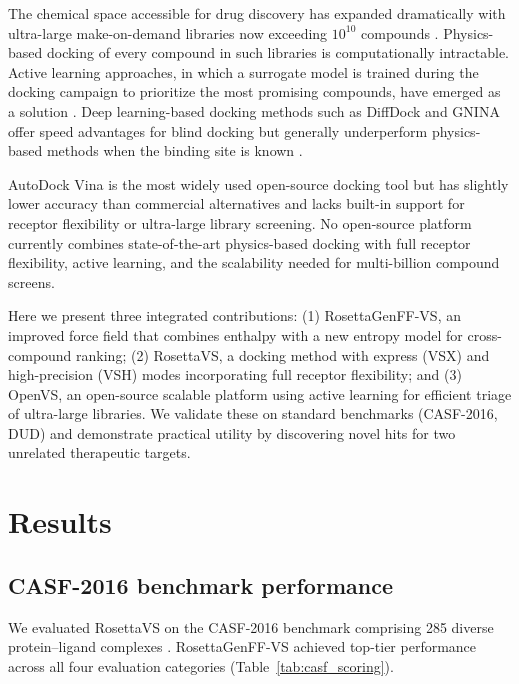 \documentclass[11pt]{article}
\begin{document}
The chemical space accessible for drug discovery has expanded dramatically with ultra-large make-on-demand libraries now exceeding $10^{10}$ compounds \citep{irwin2020}. Physics-based docking of every compound in such libraries is computationally intractable. Active learning approaches, in which a surrogate model is trained during the docking campaign to prioritize the most promising compounds, have emerged as a solution \citep{graff2021, gentile2020, yang2021}. Deep learning-based docking methods such as DiffDock \citep{corso2023} and GNINA \citep{mcnutt2021} offer speed advantages for blind docking but generally underperform physics-based methods when the binding site is known \citep{shen2021}.

AutoDock Vina \citep{trott2010} is the most widely used open-source docking tool but has slightly lower accuracy than commercial alternatives and lacks built-in support for receptor flexibility or ultra-large library screening. No open-source platform currently combines state-of-the-art physics-based docking with full receptor flexibility, active learning, and the scalability needed for multi-billion compound screens.

Here we present three integrated contributions: (1) RosettaGenFF-VS, an improved force field that combines enthalpy with a new entropy model for cross-compound ranking; (2) RosettaVS, a docking method with express (VSX) and high-precision (VSH) modes incorporating full receptor flexibility; and (3) OpenVS, an open-source scalable platform using active learning for efficient triage of ultra-large libraries. We validate these on standard benchmarks (CASF-2016, DUD) and demonstrate practical utility by discovering novel hits for two unrelated therapeutic targets.

\section{Results}

\subsection{CASF-2016 benchmark performance}

We evaluated RosettaVS on the CASF-2016 benchmark comprising 285 diverse protein--ligand complexes \citep{su2020}. RosettaGenFF-VS achieved top-tier performance across all four evaluation categories (Table~\ref{tab:casf_scoring}).
\end{document}
